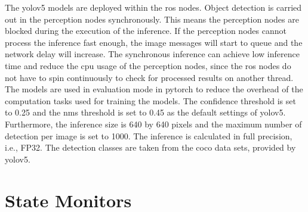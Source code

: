 The \gls{yolo}v5 models are deployed within the \gls{ros} nodes. Object detection is carried out in the perception nodes synchronously. This means the perception nodes are blocked during the execution of the inference. If the perception nodes cannot process the inference fast enough, the image messages will start to queue and the network delay will increase. The synchronous inference can achieve low inference time and reduce the \gls{cpu} usage of the perception nodes, since the \gls{ros} nodes do not have to spin continuously to check for processed results on another thread. The models are used in evaluation mode in \gls{pytorch} to reduce the overhead of the computation tasks used for training the models. The confidence threshold is set to 0.25 and the \gls{nms} threshold is set to 0.45 as the default settings of \gls{yolo}v5. Furthermore, the inference size is 640 by 640 pixels and the maximum number of detection per image is set to 1000. The inference is calculated in full precision, i.e., FP32. The detection classes are taken from the \gls{coco} data sets, provided by \gls{yolo}v5. 




\section{State Monitors}\label{sec:state_monitors}


